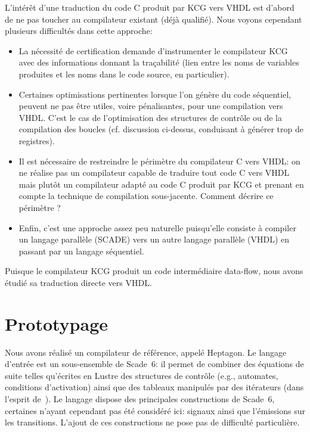 \documentclass[a4paper]{article}
\newcommand{\LANG}{{\sc Heptagon}}
\newcommand{\lustre}{{\sc Lustre}}
\newcommand{\scadesix}{{\sc Scade~6}}
\begin{document}
L'int\'er\^et d'une traduction du code C produit par KCG vers VHDL est
d'abord de ne pas toucher au compilateur existant (d\'ej\`a qualifi\'e). Nous voyons
cependant plusieurs difficult\'es dans cette approche:
\begin{itemize}
\item La n\'ecessit\'e de certification demande d'instrumenter le
  compilateur KCG avec des informations donnant la tra\c{c}abilit\'e (lien
  entre les noms de variables produites et les noms dans le code
  source, en particulier).
\item Certaines optimisations pertinentes lorsque l'on g\'en\`ere du code
  s\'equentiel, peuvent ne pas \^etre utiles, voire p\'enalisantes, pour une
  compilation vers VHDL. C'est le cas de l'optimisation des structures
  de contr\^ole ou de la compilation des boucles (cf. discussion
  ci-dessus, conduisant \`a g\'en\'erer trop de registres).
\item Il est n\'ecessaire de restreindre le p\'erim\`etre du compilateur C
  vers VHDL: on ne r\'ealise pas un compilateur capable de traduire tout
  code C vers VHDL mais plut\^ot un compilateur adapt\'e au code C produit
  par KCG et prenant en compte la technique de compilation
  sous-jacente. Comment d\'ecrire ce p\'erim\`etre ?
\item Enfin, c'est une approche assez peu naturelle puisqu'elle
  consiste \`a compiler un langage parall\`ele (SCADE) vers un autre
  langage parall\`ele (VHDL) en passant par un langage s\'equentiel.
\end{itemize}

Puisque le compilateur KCG produit un code interm\'ediaire data-flow, nous
avons \'etudi\'e sa traduction directe vers VHDL.

\section{Prototypage}
Nous avons r\'ealis\'e un compilateur de r\'ef\'erence, appel\'e \LANG{}. Le
langage d'entr\'ee est un sous-ensemble de \scadesix: il permet de
combiner des \'equations de suite telles qu'\'ecrites en \lustre{} des
structures de contr\^ole (e.g., automates, conditions d'activation)
ainsi que des tableaux manipul\'es par des it\'erateurs (dans l'esprit
de~\cite{lucy:genie00,morel-07-jes}). Le langage dispose des
principales constructions de \scadesix, certaines n'ayant cependant pas
\'et\'e consid\'er\'e ici: signaux ainsi que l'\'emissions sur les transitions. L'ajout
de ces constructions ne pose pas de difficult\'e particuli\`ere.
\end{document}
